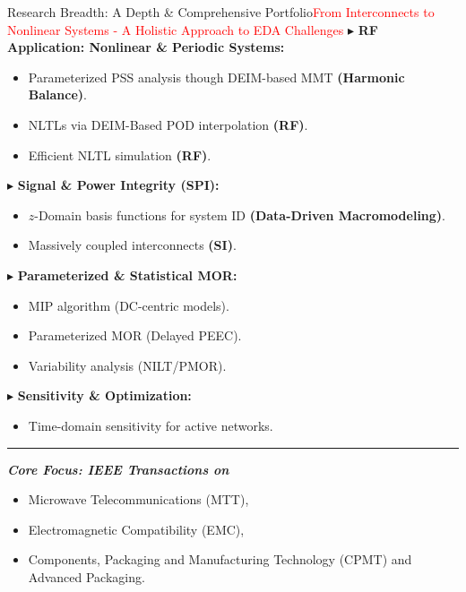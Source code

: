 \begin{frame}{Research Breadth: A Depth \& Comprehensive Portfolio}{\vspace*{0.15cm}\textcolor{red}{\normalsize From Interconnects to Nonlinear Systems - A Holistic Approach to EDA Challenges}}
	{\large $\blacktriangleright$ \bfseries RF Application: Nonlinear \& Periodic Systems:}
	\begin{itemize}
		\item \textbf{} Parameterized PSS analysis though DEIM-based MMT \textbf{(Harmonic Balance)}.
		\item \textbf{} NLTLs via DEIM-Based POD interpolation \textbf{(RF)}.
		\item \textbf{} Efficient NLTL simulation \textbf{(RF)}.
	\end{itemize}

	{\large$\blacktriangleright$ \bfseries Signal \& Power Integrity (SPI):}
	\begin{itemize}
		\item \textbf{} $z$-Domain basis functions for system ID \textbf{(Data-Driven Macromodeling)}.
		\item \textbf{} Massively coupled interconnects \textbf{(SI)}.
	\end{itemize}

	{\large$\blacktriangleright$ \bfseries Parameterized \& Statistical MOR:}
	\begin{itemize}
		\item \textbf{} MIP algorithm (DC-centric models).
		\item \textbf{} Parameterized MOR (Delayed PEEC).
		\item \textbf{} Variability analysis (NILT/PMOR).
	\end{itemize}

	{\large$\blacktriangleright$ \bfseries Sensitivity \& Optimization:}
	\begin{itemize}
		\item \textbf{} Time-domain sensitivity for active networks.
	\end{itemize}
	\vfill

	\begin{flushleft}
		{\color{lightgray}\rule{0.75\textwidth}{0.4pt}}
	\end{flushleft}
	\textit{\textbf{Core Focus: IEEE Transactions on}}
	\begin{itemize}
		\item[\nld] Microwave Telecommunications (MTT),
		\item[\nld] Electromagnetic Compatibility (EMC),
		\item[\nld] Components, Packaging and Manufacturing Technology (CPMT) and Advanced Packaging.
	\end{itemize}
\end{frame}
